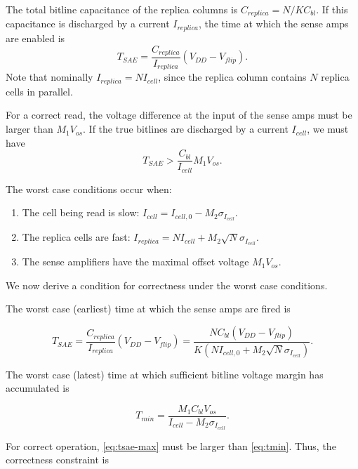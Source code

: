 The total bitline capacitance of the replica columns is $ C_{replica} = N/K C_{bl}. $
If this capacitance is discharged by a current $I_{replica}$, the time at which the sense amps are enabled is
\begin{equation}
T_{SAE} = \frac{C_{replica}}{I_{replica}}\left( V_{DD} - V_{flip} \right).
\end{equation}
Note that nominally $I_{replica} = N I_{cell}$, since the replica column contains $N$ replica cells in parallel.

For a correct read, the voltage difference at the input of the sense amps must be larger than $M_1 V_{os}.$
If the true bitlines are discharged by a current $I_{cell}$, we must have
\begin{equation}
T_{SAE} > \frac{C_{bl}}{I_{cell}} M_1 V_{os}.
\end{equation}

The worst case conditions occur when:
\begin{enumerate}
\item The cell being read is slow: $ I_{cell} = I_{cell,0} - M_2 \sigma_{I_{cell}}. $

\item The replica cells are fast: $ I_{replica} = N I_{cell} + M_2 \sqrt{N} \sigma_{I_{cell}}. $

\item The sense amplifiers have the maximal offset voltage $M_1 V_{os}$.
\end{enumerate}

We now derive a condition for correctness under the worst case conditions.

The worst case (earliest) time at which the sense amps are fired is

\begin{equation} \label{eq:tsae-max}
T_{SAE} = \frac{C_{replica}}{I_{replica}} \left( V_{DD} - V_{flip} \right)
= \frac{ N C_{bl}  \left(V_{DD} - V_{flip} \right) }{ K \left( N I_{cell,0} + M_2 \sqrt{N} \sigma_{I_{cell}} \right)}.
\end{equation}

The worst case (latest) time at which sufficient bitline voltage margin has accumulated is

\begin{equation} \label{eq:tmin}
T_{min} = \frac{M_1 C_{bl} V_{os}}{I_{cell} - M_2 \sigma_{I_{cell}}}.
\end{equation}

For correct operation, \ref{eq:tsae-max} must be larger than \ref{eq:tmin}. Thus, the correctness constraint is

